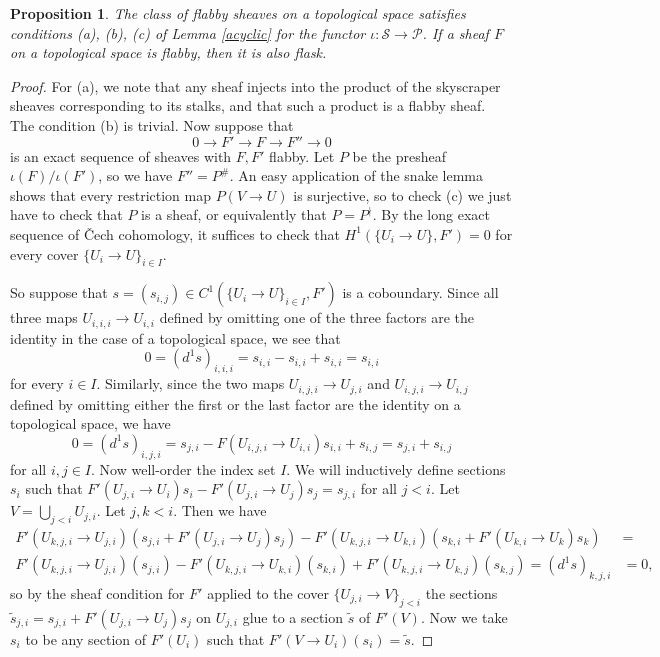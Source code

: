 \documentclass[letterpaper,11pt]{article}
\newtheorem{prop}{Proposition}
\theoremstyle{definition}
\theoremstyle{remark}
\begin{document}
\begin{prop}\label{flabbyacyclic} The class of flabby sheaves on a topological space satisfies conditions {\rm (a), (b), (c)} of Lemma \ref{acyclic} for the functor $\iota : \mathcal{S} \rightarrow \mathcal{P}$. If a sheaf $F$ on a topological space is flabby, then it is also flask.
\end{prop}
\begin{proof} For (a), we note that any sheaf injects into the product of the skyscraper sheaves corresponding to its stalks, and that such a product is a flabby sheaf. The condition (b) is trivial. Now suppose that
\[
0 \rightarrow F' \rightarrow F \rightarrow F'' \rightarrow 0
\]
is an exact sequence of sheaves with $F, F'$ flabby. Let $P$ be the presheaf $\iota(F)/\iota(F')$, so we have $F'' = P^\#$. An easy application of the snake lemma shows that every restriction map $P(V\rightarrow U)$ is surjective, so to check (c) we just have to check that $P$ is a sheaf, or equivalently that $P=P^\nmid$. By the long exact sequence of \v{C}ech cohomology, it suffices to check that $H^1(\{U_i\rightarrow U\}, F') = 0$ for every cover $\{U_i \rightarrow U\}_{i\in I}$.

So suppose that $s=(s_{i,j}) \in C^1(\{U_i \rightarrow U\}_{i\in I}, F')$ is a coboundary. Since all three maps $U_{i,i,i} \rightarrow U_{i,i}$ defined by omitting one of the three factors are the identity in the case of a topological space, we see that
\[
0 = (d^1s)_{i,i,i} = s_{i,i} - s_{i,i} + s_{i,i} = s_{i,i}
\]
for every $i\in I$. Similarly, since the two maps $U_{i,j,i} \rightarrow U_{j,i}$ and $U_{i,j,i} \rightarrow U_{i,j}$ defined by omitting either the first or the last factor are the identity on a topological space, we have
\[
0 = (d^1s)_{i,j,i} = s_{j,i} - F(U_{i,j,i}\rightarrow U_{i,i})s_{i,i} + s_{i,j} = s_{j,i} + s_{i,j}
\]
for all $i,j\in I$. Now well-order the index set $I$. We will inductively define sections $s_i$ such that $F'(U_{j,i}\rightarrow U_i)s_i - F'(U_{j,i}\rightarrow U_j)s_j = s_{j,i}$ for all $j < i$. Let $V = \bigcup_{j<i} U_{j,i}$. Let $j,k < i$. Then we have
\begin{align*}
F'(U_{k,j,i}\rightarrow U_{j,i})(s_{j,i}+F'(U_{j,i}\rightarrow U_j)s_j) - F'(U_{k,j,i}\rightarrow U_{k,i})(s_{k,i}+F'(U_{k,i}\rightarrow U_k)s_k) &= \\
F'(U_{k,j,i}\rightarrow U_{j,i})(s_{j,i}) - F'(U_{k,j,i}\rightarrow U_{k,i})(s_{k,i}) + F'(U_{k,j,i}\rightarrow U_{k,j})(s_{k,j}) = (d^1s)_{k,j,i} &= 0,
\end{align*}
so by the sheaf condition for $F'$ applied to the cover $\{U_{j,i}\rightarrow V\}_{j<i}$ the sections $\tilde{s}_{j,i} = s_{j,i}+F'(U_{j,i}\rightarrow U_j)s_j$ on $U_{j,i}$ glue to a section $\tilde{s}$ of $F'(V)$. Now we take $s_i$ to be any section of $F'(U_i)$ such that $F'(V\rightarrow U_i)(s_i) = \tilde{s}$.


\end{proof}
\end{document}
